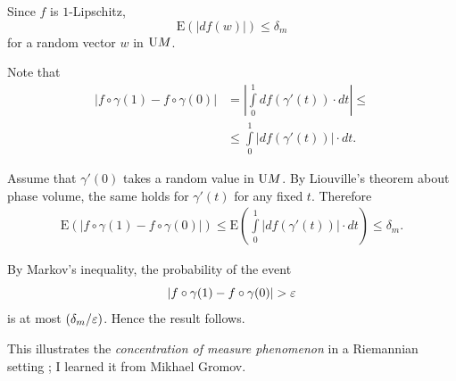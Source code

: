 Since $f$ is $1$-Lipschitz,
\[\mathrm{E}(|df(w)|)\le\delta_m\]
for a random vector $w$ in $\mathrm{U} M$.


Note that 
\begin{align*}
|f\circ \gamma(1)-f\circ\gamma(0)|
&=
\left|\int\limits_0^1df(\gamma'(t))\cdot dt\right|\le \\
&\le \int\limits_0^1\left|df(\gamma'(t))\right|\cdot dt.
\end{align*}

Assume that $\gamma'(0)$ takes a random value in $\mathrm{U} M$.
By Liouville's theorem about phase volume, the same holds for $\gamma'(t)$
for any fixed $t$.
Therefore
\begin{align*}
\mathrm{E}(|f\circ \gamma(1)-f\circ\gamma(0)|)\le \mathrm{E}\left(\int\limits_0^1|df(\gamma'(t))|\cdot dt\right)\le\delta_m.
\end{align*}

By Markov's inequality,
the probability of the event 
\[|f\circ \gamma(1)-f\circ\gamma(0)|>\eps\]
is at most $(\delta_m/\varepsilon)$.
Hence the result follows.
\qeds

This illustrates the
\emph{concentration of measure phenomenon}
in a Riemannian setting
\cite{milman-schechtman,ledoux};
I learned it from Mikhael Gromov.
